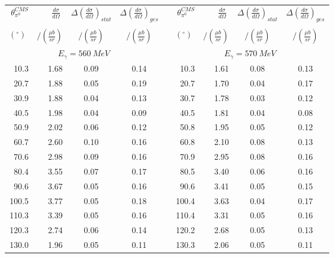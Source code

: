 \begin{table}[htbp] 
\begin{center} 
\begin{tabular}{|r|r|c|c|l|r|r|c|c|} 

\cline{1-4}
\cline{6-9} 
$\theta_{\pi^0}^{CMS}$ & 
$\displaystyle\frac{d\sigma}{d\Omega}\;$ & 
${\Delta}\left( \frac{d\sigma}{d\Omega}\right)_{stat}$ & 
${\Delta}\left( \frac{d\sigma}{d\Omega}\right)_{ges}$ & & 
$\theta_{\pi^0}^{CMS}$ & 
$\displaystyle\frac{d\sigma}{d\Omega}\;$ & 
${\Delta}\left( \frac{d\sigma}{d\Omega}\right)_{stat}$ & 
${\Delta}\left( \frac{d\sigma}{d\Omega}\right)_{ges}$ \\ 
& & & & & & & &\\ 
 $(^{\circ})\;$ & $/(\frac{{\mu}b}{sr})$ & $/(\frac{{\mu}b}{sr})$ & $/(\frac{{\mu}b}{sr})$ & & $(^{\circ})\;$ & $/(\frac{{\mu}b}{sr})$ & $/(\frac{{\mu}b}{sr})$ & $/(\frac{{\mu}b}{sr})$ \\ 
\cline{1-4} 
\cline{6-9} 
\multicolumn{4}{|c|}{ $E_{\gamma}=560~MeV$} & & 
\multicolumn{4}{c|}{ $E_{\gamma}=570~MeV$} \\ 
\cline{1-4} 
\cline{6-9} 
 10.3 &  1.68 &  0.09 &  0.14 & &  10.3 &  1.61 &  0.08 &  0.13 \\ 
 20.7 &  1.88 &  0.05 &  0.19 & &  20.7 &  1.70 &  0.04 &  0.17 \\ 
 30.9 &  1.88 &  0.04 &  0.13 & &  30.7 &  1.78 &  0.03 &  0.12 \\ 
 40.5 &  1.98 &  0.04 &  0.09 & &  40.5 &  1.81 &  0.04 &  0.08 \\ 
 50.9 &  2.02 &  0.06 &  0.12 & &  50.8 &  1.95 &  0.05 &  0.12 \\ 
 60.7 &  2.60 &  0.10 &  0.16 & &  60.8 &  2.10 &  0.08 &  0.13 \\ 
 70.6 &  2.98 &  0.09 &  0.16 & &  70.9 &  2.95 &  0.08 &  0.16 \\ 
 80.4 &  3.55 &  0.07 &  0.17 & &  80.5 &  3.40 &  0.06 &  0.16 \\ 
 90.6 &  3.67 &  0.05 &  0.16 & &  90.6 &  3.41 &  0.05 &  0.15 \\ 
100.5 &  3.77 &  0.05 &  0.18 & & 100.4 &  3.63 &  0.04 &  0.17 \\ 
110.3 &  3.39 &  0.05 &  0.16 & & 110.4 &  3.31 &  0.05 &  0.16 \\ 
120.3 &  2.74 &  0.06 &  0.14 & & 120.2 &  2.68 &  0.05 &  0.13 \\ 
130.0 &  1.96 &  0.05 &  0.11 & & 130.3 &  2.06 &  0.05 &  0.11 \\ 

\end{tabular}
\end{center}
\end{table}

